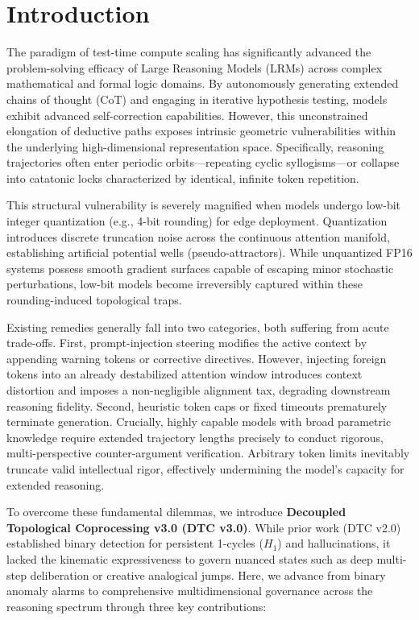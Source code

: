 \documentclass[11pt,a4paper]{article}
\begin{document}
\vspace{1em}

\section{Introduction}

The paradigm of test-time compute scaling has significantly advanced the problem-solving efficacy of Large Reasoning Models (LRMs) across complex mathematical and formal logic domains. By autonomously generating extended chains of thought (CoT) and engaging in iterative hypothesis testing, models exhibit advanced self-correction capabilities. However, this unconstrained elongation of deductive paths exposes intrinsic geometric vulnerabilities within the underlying high-dimensional representation space. Specifically, reasoning trajectories often enter periodic orbits---repeating cyclic syllogisms---or collapse into catatonic locks characterized by identical, infinite token repetition.

This structural vulnerability is severely magnified when models undergo low-bit integer quantization (e.g., 4-bit rounding) for edge deployment. Quantization introduces discrete truncation noise across the continuous attention manifold, establishing artificial potential wells (pseudo-attractors). While unquantized FP16 systems possess smooth gradient surfaces capable of escaping minor stochastic perturbations, low-bit models become irreversibly captured within these rounding-induced topological traps.

Existing remedies generally fall into two categories, both suffering from acute trade-offs. First, prompt-injection steering modifies the active context by appending warning tokens or corrective directives. However, injecting foreign tokens into an already destabilized attention window introduces context distortion and imposes a non-negligible alignment tax, degrading downstream reasoning fidelity. Second, heuristic token caps or fixed timeouts prematurely terminate generation. Crucially, highly capable models with broad parametric knowledge require extended trajectory lengths precisely to conduct rigorous, multi-perspective counter-argument verification. Arbitrary token limits inevitably truncate valid intellectual rigor, effectively undermining the model's capacity for extended reasoning.

To overcome these fundamental dilemmas, we introduce \textbf{Decoupled Topological Coprocessing v3.0 (DTC v3.0)}. While prior work (DTC v2.0) \cite{matsumoto2026dtc} established binary detection for persistent 1-cycles ($H_1$) and hallucinations, it lacked the kinematic expressiveness to govern nuanced states such as deep multi-step deliberation or creative analogical jumps. Here, we advance from binary anomaly alarms to comprehensive multidimensional governance across the reasoning spectrum through three key contributions:
\end{document}
